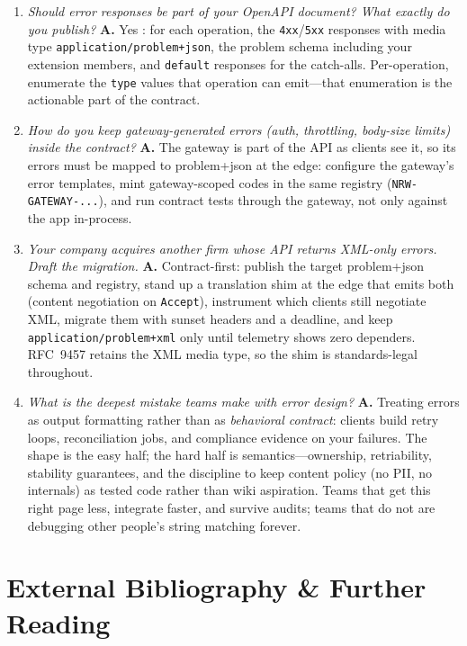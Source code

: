 \begin{enumerate}[label=\textbf{Q\arabic*.}, leftmargin=3.2em, start=27]
  \item \emph{Should error responses be part of your OpenAPI document?
        What exactly do you publish?} \textbf{A.} Yes \cite{openapi31}: for
        each operation, the \texttt{4xx}/\texttt{5xx} responses with media
        type \texttt{application/problem+json}, the problem schema including
        your extension members, and \texttt{default} responses for the
        catch-alls. Per-operation, enumerate the \texttt{type} values that
        operation can emit---that enumeration is the actionable part of the
        contract.
  \item \emph{How do you keep gateway-generated errors (auth, throttling,
        body-size limits) inside the contract?} \textbf{A.} The gateway is
        part of the API as clients see it, so its errors must be mapped to
        problem+json at the edge: configure the gateway's error templates,
        mint gateway-scoped codes in the same registry
        (\texttt{NRW-GATEWAY-...}), and run contract tests through the
        gateway, not only against the app in-process.
  \item \emph{Your company acquires another firm whose API returns
        XML-only errors. Draft the migration.} \textbf{A.} Contract-first:
        publish the target problem+json schema and registry, stand up a
        translation shim at the edge that emits both (content negotiation on
        \texttt{Accept}), instrument which clients still negotiate XML,
        migrate them with sunset headers and a deadline, and keep
        \texttt{application/problem+xml} only until telemetry shows zero
        dependers. RFC~9457 retains the XML media type, so the shim is
        standards-legal throughout.
  \item \emph{What is the deepest mistake teams make with error design?}
        \textbf{A.} Treating errors as output formatting rather than as
        \emph{behavioral contract}: clients build retry loops, reconciliation
        jobs, and compliance evidence on your failures. The shape is the
        easy half; the hard half is semantics---ownership, retriability,
        stability guarantees, and the discipline to keep content policy
        (no PII, no internals) as tested code rather than wiki aspiration.
        Teams that get this right page less, integrate faster, and survive
        audits; teams that do not are debugging other people's string
        matching forever.
\end{enumerate}

\section{External Bibliography \& Further Reading}

